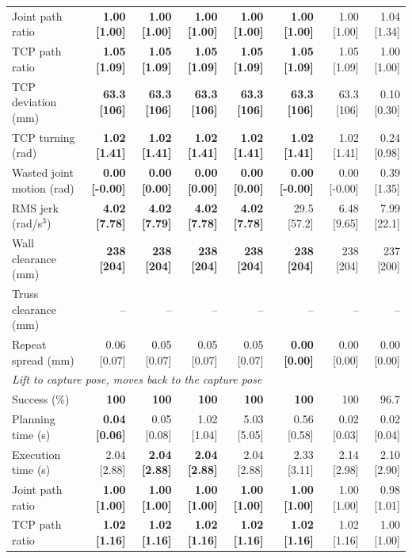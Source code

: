 \begin{table}[t]
\begin{tabular}{lrrrrrrr}
Joint path ratio & \textbf{1.00 [1.00]} & \textbf{1.00 [1.00]} & \textbf{1.00 [1.00]} & \textbf{1.00 [1.00]} & \textbf{1.00 [1.00]} & 1.00 [1.00] & 1.04 [1.34] \\
TCP path ratio & \textbf{1.05 [1.09]} & \textbf{1.05 [1.09]} & \textbf{1.05 [1.09]} & \textbf{1.05 [1.09]} & \textbf{1.05 [1.09]} & 1.05 [1.09] & 1.00 [1.00] \\
TCP deviation (mm) & \textbf{63.3 [106]} & \textbf{63.3 [106]} & \textbf{63.3 [106]} & \textbf{63.3 [106]} & \textbf{63.3 [106]} & 63.3 [106] & 0.10 [0.30] \\
TCP turning (rad) & \textbf{1.02 [1.41]} & \textbf{1.02 [1.41]} & \textbf{1.02 [1.41]} & \textbf{1.02 [1.41]} & \textbf{1.02 [1.41]} & 1.02 [1.41] & 0.24 [0.98] \\
Wasted joint motion (rad) & \textbf{0.00 [-0.00]} & \textbf{0.00 [0.00]} & \textbf{0.00 [0.00]} & \textbf{0.00 [0.00]} & \textbf{0.00 [-0.00]} & 0.00 [-0.00] & 0.39 [1.35] \\
RMS jerk (rad/s$^3$) & \textbf{4.02 [7.78]} & \textbf{4.02 [7.79]} & \textbf{4.02 [7.78]} & \textbf{4.02 [7.78]} & 29.5 [57.2] & 6.48 [9.65] & 7.99 [22.1] \\
Wall clearance (mm) & \textbf{238 [204]} & \textbf{238 [204]} & \textbf{238 [204]} & \textbf{238 [204]} & \textbf{238 [204]} & 238 [204] & 237 [200] \\
Truss clearance (mm) & -- & -- & -- & -- & -- & -- & -- \\
Repeat spread (mm) & 0.06 [0.07] & 0.05 [0.07] & 0.05 [0.07] & 0.05 [0.07] & \textbf{0.00 [0.00]} & 0.00 [0.00] & 0.00 [0.00] \\
\midrule
\multicolumn{8}{l}{\emph{Lift to capture pose, moves back to the capture pose}} \\
Success (\%) & \textbf{100} & \textbf{100} & \textbf{100} & \textbf{100} & \textbf{100} & 100 & 96.7 \\
Planning time (s) & \textbf{0.04 [0.06]} & 0.05 [0.08] & 1.02 [1.04] & 5.03 [5.05] & 0.56 [0.58] & 0.02 [0.03] & 0.02 [0.04] \\
Execution time (s) & 2.04 [2.88] & \textbf{2.04 [2.88]} & \textbf{2.04 [2.88]} & 2.04 [2.88] & 2.33 [3.11] & 2.14 [2.98] & 2.10 [2.90] \\
Joint path ratio & \textbf{1.00 [1.00]} & \textbf{1.00 [1.00]} & \textbf{1.00 [1.00]} & \textbf{1.00 [1.00]} & \textbf{1.00 [1.00]} & 1.00 [1.00] & 0.98 [1.01] \\
TCP path ratio & \textbf{1.02 [1.16]} & \textbf{1.02 [1.16]} & \textbf{1.02 [1.16]} & \textbf{1.02 [1.16]} & \textbf{1.02 [1.16]} & 1.02 [1.16] & 1.00 [1.00] \\

\end{tabular}
\end{table}
